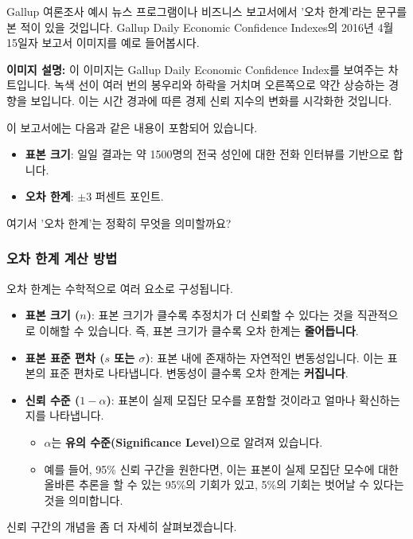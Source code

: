 \documentclass[11pt,a4paper]{article}
\begin{document}
\begin{examplebox}{Gallup 여론조사 예시}
뉴스 프로그램이나 비즈니스 보고서에서 '오차 한계'라는 문구를 본 적이 있을 것입니다.
Gallup Daily Economic Confidence Indexes의 2016년 4월 15일자 보고서 이미지를 예로 들어봅시다.

\begin{tcolorbox}[colback=gray!10, colframe=gray!50, title=\textbf{Gallup Daily: U.S. Economic Confidence Index (이미지 설명)}, sharp corners]
  \textbf{이미지 설명:} 이 이미지는 Gallup Daily Economic Confidence Index를 보여주는 차트입니다.
  녹색 선이 여러 번의 봉우리와 하락을 거치며 오른쪽으로 약간 상승하는 경향을 보입니다.
  이는 시간 경과에 따른 경제 신뢰 지수의 변화를 시각화한 것입니다.
\end{tcolorbox}

이 보고서에는 다음과 같은 내용이 포함되어 있습니다.
\begin{itemize}
    \item \textbf{표본 크기}: 일일 결과는 약 1500명의 전국 성인에 대한 전화 인터뷰를 기반으로 합니다.
    \item \textbf{오차 한계}: $\pm$3 퍼센트 포인트.
\end{itemize}
여기서 '오차 한계'는 정확히 무엇을 의미할까요?
\end{examplebox}

\subsubsection*{오차 한계 계산 방법}
오차 한계는 수학적으로 여러 요소로 구성됩니다.

\begin{itemize}
    \item \textbf{표본 크기 ($n$)}: 표본 크기가 클수록 추정치가 더 신뢰할 수 있다는 것을 직관적으로 이해할 수 있습니다. 즉, 표본 크기가 클수록 오차 한계는 \textbf{줄어듭니다}.
    \item \textbf{표본 표준 편차 ($s$ 또는 $\sigma$)}: 표본 내에 존재하는 자연적인 변동성입니다. 이는 표본의 표준 편차로 나타냅니다. 변동성이 클수록 오차 한계는 \textbf{커집니다}.
    \item \textbf{신뢰 수준 ($1 - \alpha$)}: 표본이 실제 모집단 모수를 포함할 것이라고 얼마나 확신하는지를 나타냅니다.
    \begin{itemize}
        \item $\alpha$는 \textbf{유의 수준(Significance Level)}으로 알려져 있습니다.
        \item 예를 들어, 95\% 신뢰 구간을 원한다면, 이는 표본이 실제 모집단 모수에 대한 올바른 추론을 할 수 있는 95\%의 기회가 있고, 5\%의 기회는 벗어날 수 있다는 것을 의미합니다.
    \end{itemize}
\end{itemize}
신뢰 구간의 개념을 좀 더 자세히 살펴보겠습니다.
\end{document}
